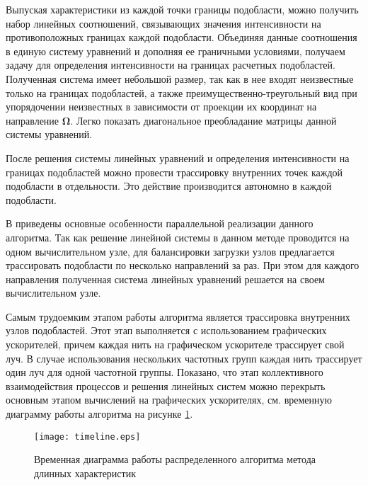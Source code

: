 Выпуская характеристики из каждой точки границы подобласти, можно получить набор линейных соотношений, связывающих значения интенсивности на противоположных границах каждой подобласти. Объединяя данные соотношения в единую систему уравнений и дополняя ее граничными условиями, получаем задачу для определения интенсивности на границах расчетных подобластей. Полученная система имеет небольшой размер, так как в нее входят неизвестные только на границах подобластей, а также преимущественно-треугольный вид при упорядочении неизвестных в зависимости от проекции их координат на направление $\boldsymbol \Omega$. Легко показать диагональное преобладание матрицы данной системы уравнений.

После решения системы линейных уравнений и определения интенсивности на границах подобластей можно провести трассировку внутренних точек каждой подобласти в отдельности. Это действие производится автономно в каждой подобласти.

В  приведены основные особенности параллельной реализации данного алгоритма. Так как решение линейной системы в данном методе проводится на одном вычислительном узле, для балансировки загрузки узлов предлагается трассировать подобласти по несколько направлений за раз. При этом для каждого направления полученная система линейных уравнений решается на своем вычислительном узле.

Самым трудоемким этапом работы алгоритма является трассировка внутренних узлов подобластей. Этот этап выполняется с использованием графических ускорителей, причем каждая нить на графическом ускорителе трассирует свой луч. В случае использования нескольких частотных групп каждая нить трассирует один луч для одной частотной группы.
Показано, что этап коллективного взаимодействия процессов и решения линейных систем можно перекрыть основным этапом вычислений на графических ускорителях, см. временную диаграмму работы алгоритма на рисунке \ref{fig:timeline}.
\begin{figure}[ht!]
\centering
\texttt{[image: timeline.eps]}
\caption{Временная диаграмма работы распределенного алгоритма метода длинных характеристик}
\label{fig:timeline}
\end{figure}


